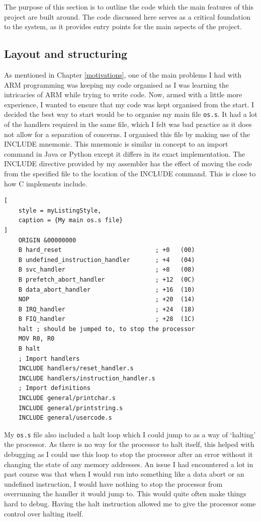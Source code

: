 The purpose of this section is to outline the code which the main features of this project are built around. The code discussed here serves as a critical foundation to the system, as it provides entry points for the main aspects of the project.
\subsection{Layout and structuring}
As mentioned in Chapter \ref{motivations}, one of the main problems I had with ARM programming was keeping my code organised as I was learning the intricacies of ARM while trying to write code. Now, armed with a little more experience, I wanted to ensure that my code was kept organised from the start. I decided the best way to start would be to organise my main file \verb|os.s|. It had a lot of the handlers required in the same file, which I felt was bad practice as it does not allow for a separation of concerns. I organised this file by making use of the INCLUDE mnemonic. This mnemonic is similar in concept to an import command in Java or Python except it differs in its exact implementation. The INCLUDE directive provided by my assembler has the effect of moving the code from the specified file to the location of the INCLUDE command. This is close to how C implements include. %

\begin{lstlisting}[
	style = myListingStyle,
	caption = {My main os.s file}
]
	ORIGIN &00000000
	B hard_reset                          ; +0   (00)
	B undefined_instruction_handler       ; +4   (04)
	B svc_handler                         ; +8   (08)
	B prefetch_abort_handler              ; +12  (0C)
	B data_abort_handler                  ; +16  (10)
	NOP                                   ; +20  (14)
	B IRQ_handler                         ; +24  (18)
	B FIQ_handler                         ; +28  (1C)
	halt ; should be jumped to, to stop the processor
	MOV R0, R0
	B halt
	; Import handlers
	INCLUDE handlers/reset_handler.s
	INCLUDE handlers/instruction_handler.s
	; Import definitions
	INCLUDE general/printchar.s
	INCLUDE general/printstring.s
	INCLUDE general/usercode.s

\end{lstlisting}


My \verb|os.s| file also included a halt loop which I could jump to as a way of `halting' the processor. As there is no way for the processor to halt itself,
this helped with debugging as I could use this loop to stop the processor after an error without it changing the state of any memory addresses. An issue I had encountered a lot in past course was that when I would run into something like a data abort or an undefined instruction, I would have nothing to stop the processor from overrunning the handler it would jump to. This would quite often make things hard to debug. Having the halt instruction allowed me to give the processor some control over halting itself.
